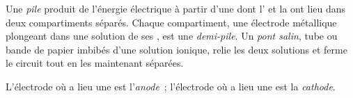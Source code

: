 \begin{definition}\label{def:g12:cells-and-electrolysis:cell}
Une \emph{pile} produit de l'énergie électrique à partir
d'une  dont l' et la  ont
lieu dans deux compartiments séparés. Chaque compartiment, une électrode
métallique plongeant dans une solution de ses , est une
\emph{demi-pile}. Un \emph{pont salin},
tube ou bande de papier imbibés d'une solution ionique, relie les deux
solutions et ferme le circuit tout en les maintenant séparées.
\end{definition}

\begin{definition}\label{def:g12:cells-and-electrolysis:anode}
L'électrode où a lieu une  est l'\emph{anode}~;
l'électrode où a lieu une  est la
\emph{cathode}.
\end{definition}

